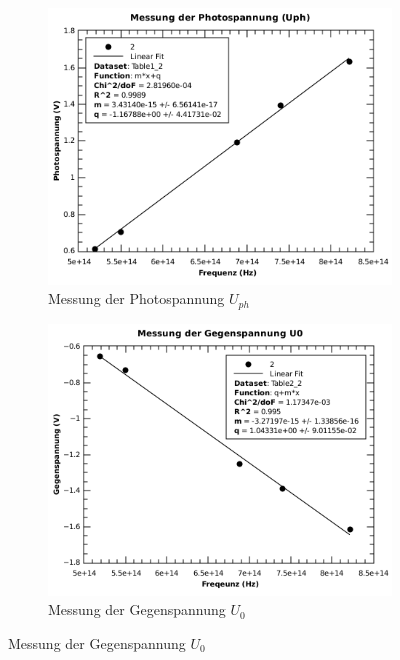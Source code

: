 \begin{figure}[H]
    \centering
    \begin{subfigure}{.45\linewidth}
        \centering
        \includegraphics[width=\linewidth]{images/photospannung}
        \caption{Messung der Photospannung $U_{ph}$}
        \label{fig:photospannung}
    \end{subfigure}
    \begin{subfigure}{.45\linewidth}
        \centering
        \includegraphics[width=\linewidth]{images/gegenspannung}
        \caption{Messung der Gegenspannung $U_0$}
        \label{fig:gegenspannung}
    \end{subfigure}
\end{figure}

